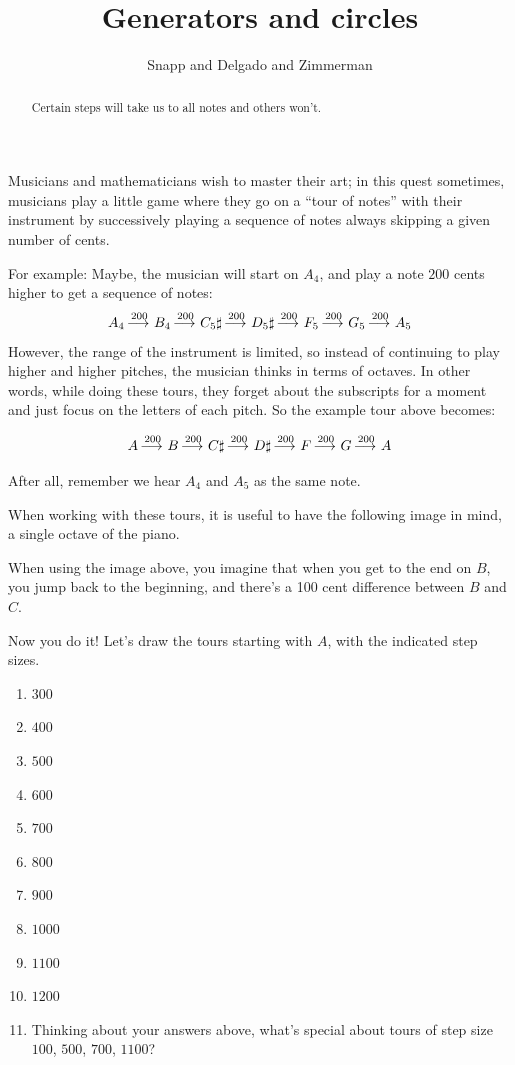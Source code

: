 \documentclass[12pt,noauthor,nooutcomes, handout]{ximera}
\author{Snapp and Delgado and Zimmerman}
\title{Generators and circles}
\begin{document}
\begin{abstract}
  Certain steps will take us to all notes and others won't.
\end{abstract}
\maketitle




Musicians and mathematicians wish to master their art; in this quest sometimes, musicians play a little game where they go on a ``tour of notes'' with their instrument by successively playing a sequence of notes always skipping a given number of cents. 

For example: Maybe, the musician will start on $A_4$, and play a note $200$ cents higher to get a sequence of notes:
\[
A_4 \mathop{\longrightarrow\,}\limits^{200} B_4 \mathop{\longrightarrow\,}\limits^{200} C_5\sharp \mathop{\longrightarrow\,}\limits^{200} D_5\sharp \mathop{\longrightarrow\,}\limits^{200} F_5 \mathop{\longrightarrow\,}\limits^{200} G_5 \mathop{\longrightarrow\,}\limits^{200} A_5
\]
However, the range of the instrument is limited, so instead of continuing to play higher and higher pitches, the musician thinks in terms of octaves. In other words, while doing these tours, they forget about the subscripts for a moment and just focus on the letters of each pitch. So the example tour above becomes:

\[
A \mathop{\longrightarrow\,}\limits^{200} B \mathop{\longrightarrow\,}\limits^{200} C\sharp \mathop{\longrightarrow\,}\limits^{200} D\sharp \mathop{\longrightarrow\,}\limits^{200} F \mathop{\longrightarrow\,}\limits^{200} G \mathop{\longrightarrow\,}\limits^{200} A
\]

After all, remember we hear $A_4$ and $A_5$ as the same note.


When working with these tours, it is useful to have the following image in mind, a single octave of the piano.

\ttPianoNoStaff

When using the image above, you imagine that when you get to the end on $B$, you jump back to the beginning, and there's a 100 cent difference between $B$ and $C$.

\begin{question} Now you do it! Let's draw the tours starting with $A$, with the indicated step sizes.
\begin{enumerate}
    \item $300$
    \item $400$ 
    \item $500$
    \item $600$
    \item $700$
    \item $800$ 
    \item $900$
    \item $1000$
    \item $1100$
    \item $1200$



\item Thinking about your answers above, what's special about tours of step size $100$, $500$, $700$, $1100$?
\end{enumerate}
\end{question}
\end{document}
